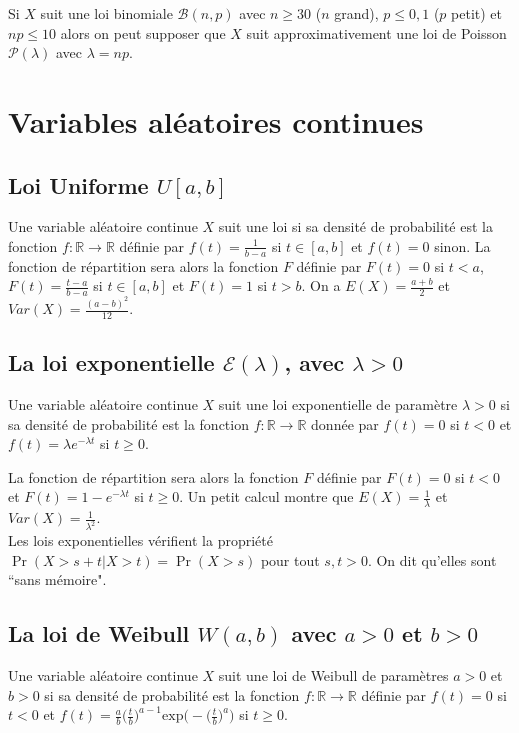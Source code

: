 \documentclass[12pt, a4paper]{article}
\begin{document}
 Si $X$ suit une loi binomiale $\mathcal{B}(n,p)$ avec $n\geq 30$ ($n$ grand), 
$p\leq 0,1$ ($p$ petit) et $np\leq 10$ alors on peut supposer que $X$ suit approximativement une loi de Poisson $\mathcal{P}(\lambda)$ avec $\lambda=np$.

\section{Variables aléatoires continues}

\subsection[Loi uniforme sur un intervalle]{Loi Uniforme $U[a,b]$}
Une variable aléatoire continue $X$ suit une loi si sa densité de probabilité est la fonction
$f:\mathbb{R}\longrightarrow \mathbb{R}$ définie par 
$f(t)=\frac{1}{b-a}$ si $t \in [a,b]$ et $f(t)=0$ sinon. 
La fonction de répartition sera alors la fonction $F$ définie par $F(t)=0$ si $t<a$, $F(t)=\frac{t-a}{b-a}$
si $t\in [a,b]$ et $F(t)=1$ si $t>b$.
On a $E(X)=\frac{a+b}{2}$ et $Var(X)=\frac{(a-b)^2}{12}$.

\subsection[Loi exponentielle]{La loi exponentielle $\mathcal{E}(\lambda)$, avec $\lambda>0$}

Une variable aléatoire continue $X$ suit une loi exponentielle de paramètre $\lambda>0$ si sa densité de 
probabilité est la fonction $f:\mathbb{R}\longrightarrow \mathbb{R}$ donnée par  $f(t)=0$ si $t<0$ et
$f(t)=\lambda e^{-\lambda t}$  si $t\geq 0$.

La fonction de répartition sera alors la fonction $F$ définie par $F(t)=0$ si $t<0$ et 
$F(t)=1-e^{-\lambda t}$ si $t\geq 0$. Un petit calcul montre que $E(X)=\frac{1}{\lambda}$ et $Var(X)=\frac{1}{\lambda^2}$.\\
Les lois exponentielles vérifient la propriété $ \Pr(X>s+t|X>t) = \Pr(X>s)$ pour tout $s,t>0$. On dit qu'elles sont ``sans mémoire".


\subsection[Loi de Weibull]{La loi de Weibull $W(a,b)$ avec $a>0$ et $b>0$}

Une variable aléatoire continue $X$ suit une loi de Weibull de paramètres $a>0$ et $b>0$ si sa densité de probabilité est la 
fonction $f:\mathbb{R}\longrightarrow \mathbb{R}$ définie par  $f(t)=0$ si $t<0$ et
$f(t)=\frac{a}{b} \big( \frac{t}{b} \big)^{a-1} \mathrm{exp}\big( - \big( \frac{t}{b} \big)^{a} \big)$ si  $t\geq 0$.
\end{document}
